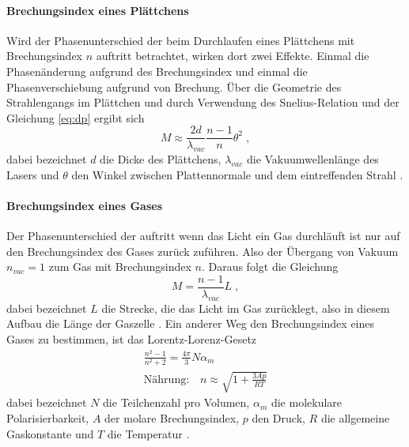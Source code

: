 \paragraph{Brechungsindex eines Plättchens}
Wird der Phasenunterschied der beim Durchlaufen eines Plättchens mit Brechungsindex $n$ auftritt betrachtet,
wirken dort zwei Effekte. Einmal die Phasenänderung aufgrund des Brechungsindex und einmal die
Phasenverschiebung aufgrund von Brechung. Über die Geometrie des Strahlengangs im Plättchen und durch
Verwendung des Snelius-Relation und der Gleichung \eqref{eq:dp} ergibt sich
\begin{equation}
M \approx \frac{2d}{\lambda_{vac}} \frac{n-1}{n} \theta^2 \; ,
\label{eq:pM}
\end{equation}
dabei bezeichnet $d$ die Dicke des Plättchens, $\lambda_{vac}$ die Vakuumwellenlänge des Lasers und $\theta$ den
Winkel zwischen Plattennormale und dem eintreffenden Strahl \cite{Anleitung}.
\paragraph{Brechungsindex eines Gases}
Der Phasenunterschied der auftritt wenn das Licht ein Gas durchläuft ist nur auf den Brechungsindex des
Gases zurück zuführen. Also der Übergang von Vakuum $n_{vac}= 1$ zum Gas mit Brechungsindex $n$. Daraus folgt
die Gleichung
\begin{equation}
M = \frac{n-1}{\lambda_{vac}} L \; ,
\label{eq:lM}
\end{equation}
dabei bezeichnet $L$ die Strecke, die das Licht im Gas zurücklegt, also in diesem Aufbau die Länge der Gaszelle
\cite{Anleitung}. Ein anderer Weg den Brechungsindex eines Gases zu bestimmen, ist das Lorentz-Lorenz-Gesetz
\begin{gather}
\frac{n^2 -1}{n^2 +2} = \frac{4\pi}{3} N \alpha_m \\
\text{Nährung:} \quad n \approx \sqrt{1+ \frac{3Ap}{RT}}
\label{eq:NLL}
\end{gather}
dabei bezeichnet $N$ die Teilchenzahl pro Volumen, $\alpha_m$ die molekulare Polarisierbarkeit, $A$ der
molare Brechungsindex, $p$ den Druck, $R$ die allgemeine Gaskonstante und $T$ die Temperatur
\cite{LLG}.
